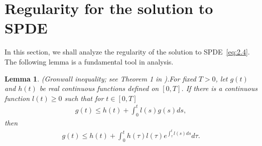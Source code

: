 \documentclass[11pt]{article}
\numberwithin{equation}{section}%
\numberwithin{figure}{section}%
\newtheorem{lemma}[theorem]{Lemma}
\theoremstyle{remark}
\begin{document}
	\section{Regularity for the solution to SPDE}\label{sec:3}
	In this section, we shall analyze the regularity of the solution to SPDE~\eqref{eq:2.4}. The following lemma is a fundamental tool in analysis.
	\begin{lemma}(Gronwall inequality; see Theorem 1 in \cite{Dragomir2003document}).\label{lem:3.2}
		For fixed $T >0$, let $g(t)$ and $h(t)$ be real continuous functions defined on $[0,T]$. If there is a continuous function $l(t)\geq 0$ such that for $t\in[0,T]$
		\begin{align*}
			g(t)\leq h(t)+\int_{0}^{t}l(s)g(s)ds,
		\end{align*}
		then
		\begin{align*}
			g(t)\leq h(t)+\int_{0}^{t}h(\tau)l(\tau)e^{\int_{\tau}^{t}l(s)ds}d\tau.
		\end{align*}
	\end{lemma}
	
\end{document}
